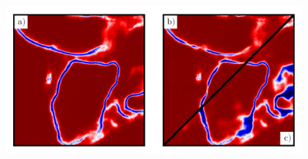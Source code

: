 \begin{minipage}[T!]{\textwidth}
        \centering
        \begin{minipage}{0.45\textwidth}
\centering

        \includegraphics[width=0.85\textwidth,trim=0.1in 0.0in 0.05in 0.0in,clip]{figs/noisy_affs_comparison.png}
   

\end{minipage}
\end{minipage}
